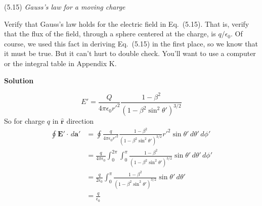 \documentclass{article}
\begin{document}
\begin{homeworkProblem}
	(5.15) \textit{Gauss's law for a moving charge}

	Verify that Gauss's law holds for the electric field in Eq.~(5.15). That is, verify that the flux of the field, through a sphere centered at the charge, is $q/\epsilon_0$. Of course, we used this fact in deriving Eq.~(5.15) in the first place, so we know that it must be true. But it can't hurt to double check. You'll want to use a computer or the integral table in Appendix K.

	\textbf{Solution}

	\begin{equation}\tag{5.15}
		E'=\frac{Q}{4\pi\epsilon_0{r'}^2}\frac{1-\beta^2}{\left(1-\beta^2\sin^2\theta'\right)^{3/2}}
	\end{equation}
	So for charge $q$ in $\hat{\mathbf{r}}$ direction
	\begin{align*}
		\oint\mathbf{E}'\cdot\,d\mathbf{a}'&=\oint\frac{q}{4\pi\epsilon_0{r'}^2}\frac{1-\beta^2}{\left(1-\beta^2\sin^2\theta'\right)^{3/2}}{r'}^2\sin\theta'\,d\theta'\,d\phi' \\
		&=\frac{q}{4\pi\epsilon_0}\int_0^{2\pi}\int_0^\pi\frac{1-\beta^2}{\left(1-\beta^2\sin^2\theta'\right)^{3/2}}\sin\theta'\,d\theta'\,d\phi' \\
		&=\frac{q}{2\epsilon_0}\int_0^\pi\frac{1-\beta^2}{\left(1-\beta^2\sin^2\theta'\right)^{3/2}}\sin\theta'\,d\theta' \\
		&=\frac{q}{\epsilon_0}
	\end{align*}
\end{homeworkProblem}

\end{document}
